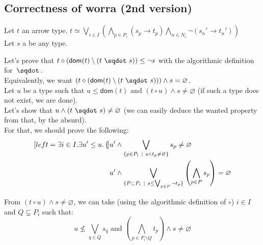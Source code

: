 \documentclass[a4paper]{article}%
\newcommand{\worra}[2]{#1\mathop{\,\sqdot\,} #2}
\newcommand{\apply}[2]{#1\circ#2}
\newcommand{\dom}[1]{\textsf{dom}(#1)}
\newcommand{\alt}{~|~}
\begin{document}
    \subsection{Correctness of worra (2nd version)}
    
    Let $t$ an arrow type. $t \simeq \bigvee_{i\in I}\left(\bigwedge_{p\in P_i}(s_p\to t_p)\bigwedge_{n\in N_i}\neg(s_n'\to t_n')\right)$\\
    Let $s$ a be any type.

    Let's prove that $\apply t {(\dom t \setminus (\worra t s))} \leq \neg s$ with the algorithmic definition for $\worra {} {}$.\\
    Equivalently, we want $(\apply t {(\dom t \setminus (\worra t s))}) \land s = \varnothing$.\\

    Let $u$ be a type such that $u \leq \dom t$ and $(\apply t u) \land s \neq \varnothing$ (if such a type does not exist, we are done).\\
    Let's show that $u \land (\worra t s) \neq \varnothing$ (we can easily deduce the wanted property from that, by the absurd).\\
    For that, we should prove the following:\\

    \begin{subequations}
        \begin{align}[left ={\exists i \in I. \exists u' \leq u. \empheqlbrace}]
          &u' \land \bigvee_{\{p\in P_i\alt s\wedge t_p\not=\varnothing\}}s_p \neq \varnothing\label{eq1a}\\
          &u' \land \bigvee_{\{P \subset P_i\alt s \leq \bigvee_{p \in P} \neg t_p\}} \left(\bigwedge_{p \in P} s_p\right) = \varnothing\label{eq1b}
        \end{align}
    \end{subequations}

  From $(\apply t u) \land s \neq \varnothing$, we can take (using the algorithmic definition of $\circ$) $i \in I$ and $Q \subsetneq P_i$ such that:\\
  \[ u \not\leq\bigvee_{q\in Q}s_q \text{\ \ \ and\ \ \ } (\bigwedge_{p\in P_i\setminus Q}t_p) \land s \neq \varnothing \]
\end{document}
